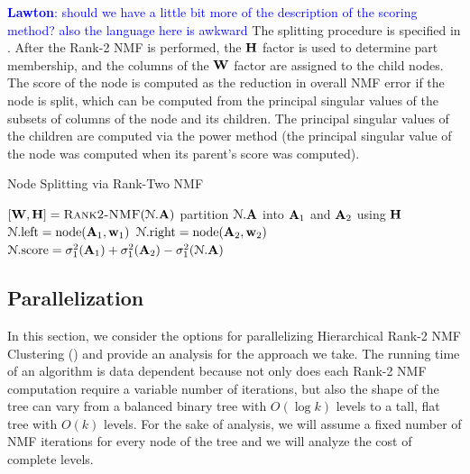 \documentclass[conference,compsoc]{IEEEtran}
\newcommand{\LM}[1]{\textcolor{blue}{\textbf{Lawton}: #1}}
\begin{document}
\LM{should we have a little bit more of the description of the scoring method? also the language here is awkward}
The splitting procedure is specified in .
After the Rank-2 NMF is performed, the $\M{H}$ factor is used to determine part membership, and the columns of the $\M{W}$ factor are assigned to the child nodes.
The score of the node is computed as the reduction in overall NMF error if the node is split, which can be computed from the principal singular values of the subsets of columns of the node and its children.
The principal singular values of the children are computed via the power method (the principal singular value of the node was computed when its parent's score was computed).


\begin{algorithm}
\caption{Node Splitting via Rank-Two NMF}
\label{alg:split}
\begin{algorithmic}[1]
		\State $[\M{W},\M{H}] = \textsc{Rank2-NMF}({\cal N}.\M{A})$ \hfill {}
		\State partition ${\cal N}.\M{A}$ into $\M{A}_1$ and $\M{A}_2$ using $\M{H}$
		\State ${\cal N}.\text{left} = \text{node}(\M{A}_1,\V{W}_1)$ \hfill {}
		\State ${\cal N}.\text{right} = \text{node}(\M{A}_2,\V{W}_2)$ \hfill {}
		\State ${\cal N}.\text{score} = \sigma_1^2(\M{A}_1) + \sigma_1^2(\M{A}_2) - \sigma_1^2({\cal N}.\M{A})$
	\EndFunction
\end{algorithmic}
\end{algorithm}

\subsection{Parallelization}
\label{sec:paralgs}

In this section, we consider the options for parallelizing Hierarchical Rank-2 NMF Clustering () and provide an analysis for the approach we take.
The running time of an algorithm is data dependent because not only does each Rank-2 NMF computation require a variable number of iterations, but also the shape of the tree can vary from a balanced binary tree with $O(\log k)$ levels to a tall, flat tree with $O(k)$ levels.
For the sake of analysis, we will assume a fixed number of NMF iterations for every node of the tree and we will analyze the cost of complete levels.
\end{document}
